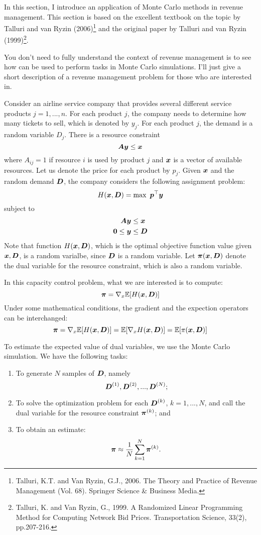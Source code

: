 In this section, I introduce an application of Monte Carlo methods in revenue management. This section is based on the excellent textbook on the topic by Talluri and van Ryzin (2006)\footnote{Talluri, K.T. and Van Ryzin, G.J., 2006. The Theory and Practice of Revenue Management (Vol. 68). Springer Science \& Business Media.} and the original paper by Talluri and van Ryzin (1999)\footnote{Talluri, K. and Van Ryzin, G., 1999. A Randomized Linear Programming Method for Computing Network Bid Prices. Transportation Science, 33(2), pp.207-216.}.

You don't need to fully understand the context of revenue management is to see how \julia{} can be used to perform tasks in Monte Carlo simulations. I'll just give a short description of a revenue management problem for those who are interested in.

Consider an airline service company that provides several different service products $j=1,...,n$. For each product $j$, the company needs to determine how many tickets to sell, which is denoted by $y_j$. For each product $j$, the demand is a random variable $D_j$. There is a resource constraint
\[
    \boldsymbol{A} \boldsymbol{y} \leq \boldsymbol{x}
\]
where $A_{ij}=1$ if resource $i$ is used by product $j$ and $\boldsymbol{x}$ is a vector of available resources. Let us denote the price for each product by $p_j$. Given $\boldsymbol{x}$ and the random demand $\boldsymbol{D}$, the company considers the following assignment problem:
\[
    H(\boldsymbol{x}, \boldsymbol{D}) = \max \ \boldsymbol{p}^\top \boldsymbol{y}
\]
subject to
\begin{align*}
    \boldsymbol{A} \boldsymbol{y} &\leq \boldsymbol{x} \\
    \boldsymbol{0} \leq \boldsymbol{y} &\leq \boldsymbol{D}
\end{align*}
\noindent Note that function $H(\boldsymbol{x}, \boldsymbol{D})$, which is the optimal objective function value given $\boldsymbol{x}, \boldsymbol{D}$, is a random varialbe, since $\boldsymbol{D}$ is a random variable. Let $\boldsymbol{\pi}(\boldsymbol{x}, \boldsymbol{D})$ denote the dual variable for the resource constraint, which is also a random variable.

In this capacity control problem, what we are interested is to compute:
\[
    \boldsymbol{\pi} = \nabla_x \mathbb{E}[ H(\boldsymbol{x}, \boldsymbol{D}) ]
\]
Under some mathematical conditions, the gradient and the expection operators can be interchanged:
\[
\boldsymbol{\pi} = \nabla_x \mathbb{E}[ H(\boldsymbol{x}, \boldsymbol{D}) ] = \mathbb{E}[ \nabla_x H(\boldsymbol{x}, \boldsymbol{D}) ] = \mathbb{E}[ \pi(\boldsymbol{x}, \boldsymbol{D})]
\]

To estimate the expected value of dual variables, we use the Monte Carlo simulation. We have the following tasks:
\begin{enumerate}
\item To generate $N$ samples of $\boldsymbol{D}$, namely
    \[
        \boldsymbol{D}^{(1)}, \boldsymbol{D}^{(2)}, ..., \boldsymbol{D}^{(N)};
    \]
\item To solve the optimization problem for each $\boldsymbol{D}^{(k)}$, $k=1,...,N$, and call the dual variable for the resource constraint $\boldsymbol{\pi}^{(k)}$; and
\item To obtain an estimate:
    \[
        \boldsymbol{\pi} \approx \frac{1}{N} \sum_{k=1}^N \boldsymbol{\pi}^{(k)}.
    \]
\end{enumerate}


